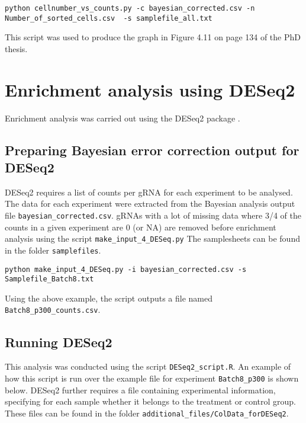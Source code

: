 \begin{small}\begin{lstlisting}
python cellnumber_vs_counts.py -c bayesian_corrected.csv -n Number_of_sorted_cells.csv  -s samplefile_all.txt 
\end{lstlisting}\end{small}

This script was used to produce the graph in Figure 4.11 on page 134 of the PhD thesis.


\section{Enrichment analysis using DESeq2}

Enrichment analysis was carried out using the DESeq2 package \cite{Love:2014eo}.

\subsection{Preparing Bayesian error correction output for DESeq2}

DESeq2 requires a list of counts per gRNA for each experiment to be analysed. The data for each experiment were extracted from the Bayesian analysis output file \verb|bayesian_corrected.csv|. gRNAs  with a  lot of missing data where 3/4 of the counts in a given experiment are 0 (or NA) are removed before enrichment analysis using the script \verb|make_input_4_DESeq.py| The samplesheets can be found in the folder \verb|samplefiles|. 

\begin{small}\begin{lstlisting}
python make_input_4_DESeq.py -i bayesian_corrected.csv -s Samplefile_Batch8.txt
\end{lstlisting}\end{small}

Using the above example, the script outputs a file named \verb|Batch8_p300_counts.csv|.

\subsection{Running DESeq2}
This analysis was conducted using the script \verb|DESeq2_script.R|. An example of how this script is run over the example file for experiment \verb|Batch8_p300|  is shown below. DESeq2 further requires a file containing experimental information, specifying for each sample whether it belongs to the treatment or control group. These files can be found in the folder \verb|additional_files/ColData_forDESeq2|.

